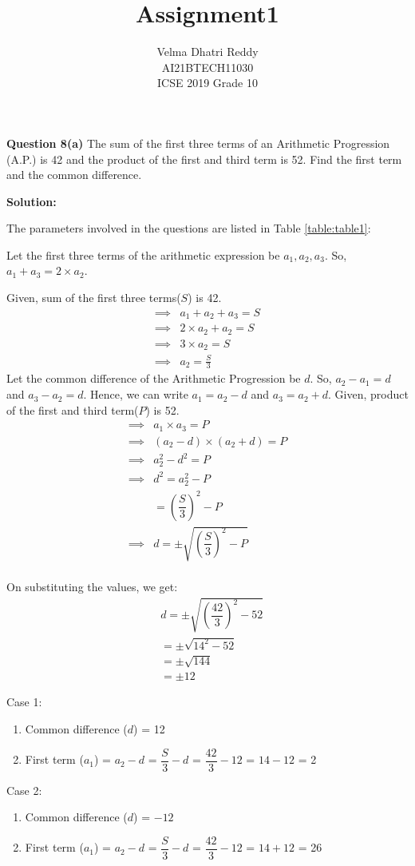\documentclass[journal ,12pt, twocolumn]{IEEEtran}
\title{Assignment1}
\author{Velma Dhatri Reddy \\ \normalsize AI21BTECH11030 \\ \vspace*{10pt} \Large ICSE 2019 Grade 10}
\begin{document}
\maketitle
\textbf{Question 8(a)}
The sum of the first three terms of an Arithmetic Progression (A.P.) is 42 and the product of the first and third term is 52. Find the first term and the common difference.

\textbf{Solution:}

The parameters involved in the questions are listed in Table \eqref{table:table1}:
\begin{table}[ht!]
	
\caption{}
\label{table:table1}	
\end{table}

Let the first three terms of the arithmetic expression be $a_1, a_2, a_3$.
So, $a_1 + a_3 = 2\times a_2$.

Given, sum of the first three terms($S$) is 42.
\begin{align}
    \implies
    &a_1 + a_2 + a_3 = S\\
    \implies
    &2 \times a_2 + a_2 = S\\
    \implies
    & 3\times a_2 = S\\
    \implies
    & a_2 = \frac{S}{3}
\end{align}
Let the common difference of the Arithmetic Progression be $d$.
So, $a_2 - a_1 = d$ and $a_3 - a_2 = d$.
Hence, we can write $ a_1 = a_2 - d$ and $ a_3 = a_2 + d$.
Given, product of the first and third term($P$) is 52.
\begin{align}
    \implies
    &a_1 \times a_3 = P\\
    \implies 
    &(a_2 - d) \times (a_2 + d) = P\\
    \implies
    &a_2^2 - d^2 = P\\
    \implies
    &d^2 = a_2^2 - P\\
    &= \left(\dfrac{S}{3} \right)^2 - P\\
    \implies
    &d = \pm \sqrt{\left(\dfrac{S}{3} \right)^2 - P}\\
\end{align}

On substituting the values, we get:
\begin{align}
    &d = \pm \sqrt{\left(\dfrac{42}{3} \right)^2 - 52}\\
    &= \pm \sqrt{14^2 - 52}\\
    &= \pm \sqrt{144}\\
    &= \pm12
\end{align}

Case 1:
\begin{enumerate}[label=(\roman*)]
		\item Common difference ($d$) = 12
		\item First term ($a_1$) = $a_2 - d$ = $\dfrac{S}{3}- d$ = $\dfrac{42}{3} - 12$ = $14 - 12$ = 2
\end{enumerate}

Case 2:
\begin{enumerate}[label=(\roman*)]
		\item Common difference ($d$) = $-12$
		\item First term ($a_1$) = $a_2 - d$ = $\dfrac{S}{3}- d$ = $\dfrac{42}{3} - 12$ = $14 + 12$ = 26
\end{enumerate}
\end{document}
